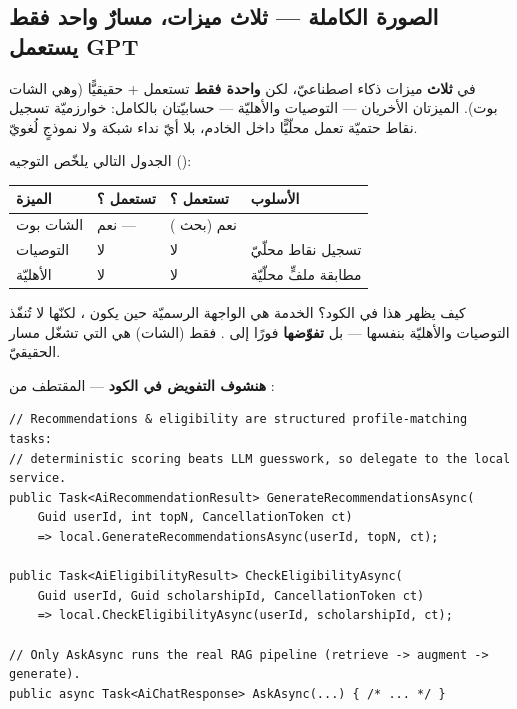 \subsection{الصورة الكاملة — ثلاث ميزات، مسارٌ واحد فقط يستعمل GPT}

\begin{keyp}
في  \textbf{ثلاث} ميزات ذكاء اصطناعيّ، لكن \textbf{واحدة فقط}
تستعمل  +  حقيقيًّا (وهي الشات بوت). الميزتان الأخريان — التوصيات
والأهليّة — حسابيّتان بالكامل: خوارزميّة تسجيل نقاط حتميّة تعمل محلّيًّا داخل الخادم،
بلا أيّ نداء شبكة ولا نموذجٍ لُغويّ.
\end{keyp}

الجدول التالي يلخّص التوجيه ():

\begin{center}
\begin{tabular}{L{3.4cm} C{3.4cm} C{2.6cm} L{4.0cm}}
\toprule
\textbf{\color{spPrimary}الميزة} & \textbf{\color{spPrimary}تستعمل ؟} & \textbf{\color{spPrimary}تستعمل ؟} & \textbf{\color{spPrimary}الأسلوب}\\
\midrule
الشات بوت & نعم —  & نعم (بحث ) & \\
التوصيات & لا & لا & تسجيل نقاط محلّيّ\\
الأهليّة & لا & لا & مطابقة ملفٍّ محلّيّة\\
\bottomrule
\end{tabular}
\end{center}

كيف يظهر هذا في الكود؟ الخدمة  هي الواجهة الرسميّة حين يكون
، لكنّها لا تُنفّذ التوصيات والأهليّة بنفسها — بل
\textbf{تفوّضها} فورًا إلى . فقط  (الشات) هي التي
تشغّل مسار  الحقيقيّ.

\textbf{هنشوف التفويض في الكود} — المقتطف من :

\begin{english}
\begin{lstlisting}[language={[Sharp]C}]
// Recommendations & eligibility are structured profile-matching tasks:
// deterministic scoring beats LLM guesswork, so delegate to the local service.
public Task<AiRecommendationResult> GenerateRecommendationsAsync(
    Guid userId, int topN, CancellationToken ct)
    => local.GenerateRecommendationsAsync(userId, topN, ct);

public Task<AiEligibilityResult> CheckEligibilityAsync(
    Guid userId, Guid scholarshipId, CancellationToken ct)
    => local.CheckEligibilityAsync(userId, scholarshipId, ct);

// Only AskAsync runs the real RAG pipeline (retrieve -> augment -> generate).
public async Task<AiChatResponse> AskAsync(...) { /* ... */ }
\end{lstlisting}
\end{english}

